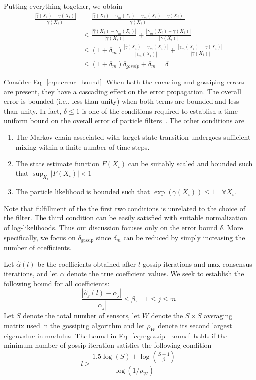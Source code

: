 \documentclass[10pt,letterpaper,final]{article}
\begin{document}
Putting everything together, we obtain
\begin{align}
\frac{|\hat{\gamma}(X_i) - \gamma(X_i)|}{|\gamma(X_i)|}&=\frac{|\hat{\gamma}(X_i) -\gamma_m(X_i) + \gamma_m(X_i) - \gamma(X_i)|}{|\gamma(X_i)|} \\
&\leq \frac{|\hat{\gamma}(X_i) -\gamma_m(X_i)|}{|\gamma(X_i)|}+\frac{|\gamma_m(X_i) - \gamma(X_i)|}{|\gamma(X_i)|} \\
&\leq (1+\delta_m)\frac{|\hat{\gamma}(X_i) -\gamma_m(X_i)|}{|\gamma_m(X_i)|}+\frac{|\gamma_m(X_i) - \gamma(X_i)|}{|\gamma(X_i)|} \\
&\leq (1+\delta_m)\delta_{gossip} + \delta_m  = \delta
\label{eqn:error_bound}
\end{align}

Consider Eq.~\eqref{eqn:error_bound}. When both the encoding and gossiping errors are present, they have a cascading effect on the error propagation. The overall error is bounded (i.e., less than unity) when both terms are bounded and less than unity. In fact, $\delta\leq 1$ is one of the conditions required to establish a time-uniform bound on the overall error of particle filters~\cite{Syamantak2015}. The other conditions are
\begin{enumerate}
\item The Markov chain associated with target state transition undergoes sufficient mixing within a finite number of time steps. 
\item The state estimate function $F(X_i)$ can be suitably scaled and bounded such that $\sup_{X_i} |F(X_i)|<1$
\item The particle likelihood is bounded such that $\exp(\gamma(X_i))\leq 1 \quad \forall X_i$. 
\end{enumerate}
Note that fulfillment of the the first two conditions is unrelated to the choice of the filter. The third condition can be easily satisfied with suitable normalization of log-likelihoods. Thus  our discussion focuses only on the error bound $\delta$. More specifically, we focus on $\delta_{\text{gossip}}$ since $\delta_m$ can be reduced by simply increasing the number of coefficients. 

Let $\hat{\alpha}(l)$ be the coefficients obtained after $l$ gossip iterations and max-consensus iterations, and let $\alpha$ denote the true coefficient values. We seek to establish the following bound for all coefficients:
\begin{equation}
\frac{|\hat{\alpha}_j(l)-\alpha_j|}{|\alpha_j|}\leq \beta, \quad 1\leq j\leq m
\label{eqn:gossip_bound}
\end{equation}
Let $S$ denote the total number of sensors, let $W$ denote the $S\times S$ averaging matrix used in the gossiping algorithm and let $\rho_W$ denote its second largest eigenvalue in modulus. The bound in Eq.~\eqref{eqn:gossip_bound} holds if the minimum number of gossip iteration satisfies the following condition~\cite{Olshevsky2009}
\begin{equation}
l\geq \frac{1.5\log(S)+\log(\frac{S-1}{\beta})}{\log(1/\rho_W)}
\label{eqn:minimum_NGossip}
\end{equation}
\end{document}
